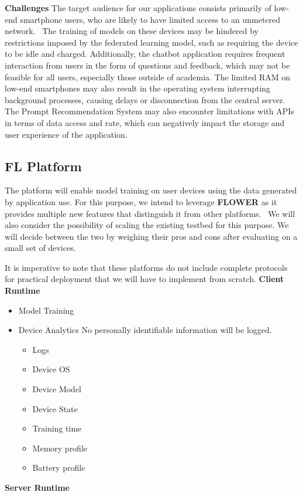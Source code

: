         \textbf{Challenges}
        The target audience for our applications consists primarily of low-end smartphone 
        users, who are likely to have limited access to an unmetered network.~\cite{10.1504/IJMC.2005.006583} The training 
        of models on these devices may be hindered by restrictions imposed by the federated 
        learning model, such as requiring the device to be idle and charged. Additionally, the 
        chatbot application requires frequent interaction from users in the form of questions and 
        feedback, which may not be feasible for all users, especially those outside of academia. 
        The limited RAM on low-end smartphones may also result in the operating system 
        interrupting background processes, causing delays or disconnection from the central 
        server. The Prompt Recommendation System may also encounter limitations with APIs 
        in terms of data access and rate, which can negatively impact the storage and user 
        experience of the application.
    
        \subsection{FL Platform}
        The platform will enable model training on user devices using the data generated by application use. For this purpose, we intend to leverage \textbf{FLOWER} as it provides multiple new features that distinguish it from other platforms.~\cite{DBLP:journals/corr/abs-2007-14390} We will also consider the possibility of scaling the existing testbed for this purpose. We will decide between the two by weighing their pros and cons after evaluating on a small set of devices. \newline

        It is imperative to note that these platforms do not include complete protocols for practical deployment that we will have to implement from scratch. \newline \newline
        \textbf{Client Runtime}
            \begin{itemize}
                \item Model Training
                \item Device Analytics \newline
                    No personally identifiable information will be logged.  
                    \begin{itemize}
                        \item Logs
                        \item Device OS
                        \item Device Model
                        \item Device State
                        \item Training time
                        \item Memory profile
                        \item Battery profile
                    \end{itemize}
            \end{itemize}
        \textbf{Server Runtime}
